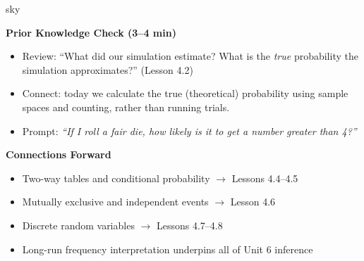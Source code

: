 \documentclass[10pt]{article}
\begin{document}
\begin{skillbox}{sky}
\begin{minipage}[t]{0.48\linewidth}
    \textbf{Prior Knowledge Check (3--4 min)}
    \begin{itemize}
        \item Review: ``What did our simulation estimate? What is the \emph{true} probability
              the simulation approximates?'' (Lesson 4.2)
        \item Connect: today we calculate the true (theoretical) probability using sample
              spaces and counting, rather than running trials.
        \item Prompt: \textit{``If I roll a fair die, how likely is it to get a number
              greater than 4?''}
    \end{itemize}
\end{minipage}
\hfill
\begin{minipage}[t]{0.48\linewidth}
    \textbf{Connections Forward}
    \begin{itemize}
        \item Two-way tables and conditional probability $\to$ Lessons 4.4--4.5
        \item Mutually exclusive and independent events $\to$ Lesson 4.6
        \item Discrete random variables $\to$ Lessons 4.7--4.8
        \item Long-run frequency interpretation underpins all of Unit 6 inference
    \end{itemize}
\end{minipage}
\end{skillbox}
\end{document}
